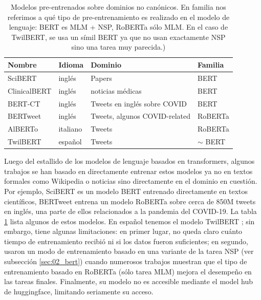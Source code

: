 \begin{table}
    \centering
    \begin{tabular}{llll}
        Nombre                                 & Idioma            & Dominio                          & Familia     \\
        \hline
        SciBERT\cite{beltagy-etal-2019-scibert}   & inglés            & Papers                           & BERT        \\
        ClinicalBERT \cite{huang2019clinicalbert} & inglés            & noticias médicas                                 & BERT        \\
        BERT-CT \cite{muller2020covid}            & inglés            & Tweets en inglés sobre COVID     & BERT        \\
        BERTweet \cite{dat2020bertweet}           & inglés            & Tweets, algunos COVID-related    & RoBERTa     \\
        AlBERTo \cite{polignano2019alberto}       & italiano          & Tweets                           & RoBERTa     \\
        TwilBERT                                  & español           & Tweets                           & $\sim$ BERT        \\
        \hline
    \end{tabular}

    \caption{Modelos pre-entrenados sobre dominios no canónicos. En familia nos referimos a qué tipo de pre-entrenamiento es realizado en el modelo de lenguaje: BERT es MLM + NSP, RoBERTa sólo MLM. En el caso de TwilBERT, se usa un símil BERT ya que no usan exactamente NSP sino una tarea muy parecida.)}
    \label{tab:bert_pretrained_models}
\end{table}


Luego del estallido de los modelos de lenguaje basados en transformers, algunos trabajos se han basado en directamente entrenar estos modelos ya no en textos formales como Wikipedia o noticias sino directamente en el dominio en cuestión. Por ejemplo, SciBERT \cite{beltagy-etal-2019-scibert} es un modelo BERT entrenado directamente en textos científicos, BERTweet \cite{dat2020bertweet} entrena un modelo RoBERTa \cite{liu2019roberta} sobre cerca de 850M tweets en inglés, una parte de ellos relacionados a la pandemia del COVID-19. La tabla \ref{tab:bert_pretrained_models} lista algunos de estos modelos. En español tenemos el modelo TwilBERT \cite{gonzalez2021twilbert}; sin embargo, tiene algunas limitaciones: en primer lugar, no queda claro cuánto tiempo de entrenamiento recibió ni si los datos fueron suficientes; en segundo, usaron un modo de entrenamiento basado en una variante de la tarea NSP (ver subsección \ref{sec:02_bert}) cuando numerosos trabajos muestran que el tipo de entrenamiento basado en RoBERTa (sólo tarea MLM) mejora el desempeño en las tareas finales. Finalmente, su modelo no es accesible mediante el model hub de huggingface, limitando seriamente su acceso.


